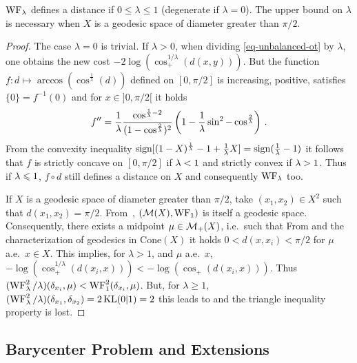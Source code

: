 \begin{proposition}
$\operatorname{WF}_\lambda$ defines a distance if $0\leq\lambda\leq1$ (degenerate if $\lambda=0$). The upper bound on $\lambda$ is necessary when $X$ is a geodesic space of diameter greater than $\pi/2$.
\end{proposition}
%
\begin{proof}
The case $\lambda=0$ is trivial. If $\lambda>0$, when dividing \eqref{eq-unbalanced-ot} by $\lambda$, one obtains the new cost $-2\log(\cos_+^{1/\lambda}(d(x,y)))$. But the function $f:d \mapsto \arccos(\cos^{\frac1{\lambda}}(d))$ defined on $[0,\pi/2]$ is increasing, positive, satisfies $\{0\}=f^{-1}(0)$ and for $x\in ]0,\pi/2[$ it holds
\[
f'' = \frac{1}{\lambda} \frac{\cos^{\frac{1}{\lambda}-2}}{(1-\cos^{\frac{2}{\lambda}})^2} \left( 1 - \frac{1}{\lambda} \sin^2 -\cos^{\frac{2}{\lambda}}\right)
\, .
\]
From the convexity inequality $\text{sign} [(1-X)^\frac{1}{\lambda}-1 + \frac{1}{\lambda} X] = \text{sign} (\frac{1}{\lambda}-1) $ it follows that $f$ is strictly concave on $[0,\pi/2]$ if $\lambda<1$ and strictly convex if $\lambda>1$.
%
Thus if $\lambda \leqslant 1$, $f \circ d$ still defines a distance on $X$ and consequently $\operatorname{WF}_\lambda$ too. 
%

If $X$ is a geodesic space of diameter greater than $\pi/2$, take $(x_1,x_2) \in X^2$ such that $d(x_1,x_2)=\pi/2$. From~\cite[Corollary 8.3]{LieroMielkeSavareLong}, $(\mathcal{M}(X), \operatorname{WF}_1)$ is itself a geodesic space. Consequently, there exists a midpoint $\mu \in \mathcal{M}_+(X)$, i.e.\ such that 
From \cite[Theorem 8.6]{LieroMielkeSavareLong} and the characterization of geodesics in $\text{Cone}(X)$ it holds $0<d(x,x_i)<\pi/2$ for  $\mu$ a.e.\ $x\in X$. This implies, for $\lambda>1$, and $\mu$ a.e.\ $x$, $-\log(\cos_+^{1/\lambda}(d(x_i,x)))<-\log(\cos_+(d(x_i,x)))$. Thus 
$(\operatorname{WF}^2_\lambda /\lambda)(\delta_{x_i},\mu)<\operatorname{WF}^2_1(\delta_{x_i},\mu)$. But, for $\lambda\geq 1$, $(\operatorname{WF}^2_\lambda/\lambda)(\delta_{x_1},\delta_{x_2})=2\operatorname{KL}(0|1)=2$ this leads to
and the triangle inequality property is lost. %
\end{proof}


\subsection{Barycenter Problem and Extensions}
\label{subsec_barycenter}

